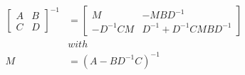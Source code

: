 \begin{lemma}

    \begin{align*}
        \left[\begin{array}{cc}
                  A&B\\
                  C&D
        \end{array}\right]^{-1}&=\left[\begin{array}{cc}
                                           M&-MBD^{-1}\\
                                           -D^{-1}CM&D^{-1}+D^{-1}CMBD^{-1}
                                        \end{array}\right]\\
        &with\\
        M&=(A-BD^{-1}C)^{-1}
    \end{align*}

    \label{lemma:inverseOfBlockMatrix}
\end{lemma}

